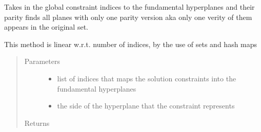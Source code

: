 \documentclass[letterpaper,10pt,english]{sphinxmanual}
\begin{document}
\begin{fulllineitems}
\label{\detokenize{ppopt.upop:ppopt.upop.upop_utils.get_outer_boundaries}}
\sphinxAtStartPar
Takes in the global constraint indices to the fundamental hyperplanes and their parity finds all planes with only one parity version aka only one verity of them appears in the original set.

\sphinxAtStartPar
This method is linear w.r.t. number of indices, by the use of sets and hash maps
\begin{quote}\begin{description}
\item[{Parameters}] \leavevmode\begin{itemize}
\item {} 
\sphinxAtStartPar
{} \textendash{} list of indices that maps the solution constraints into the fundamental hyperplanes

\item {} 
\sphinxAtStartPar
{} \textendash{} the side of the hyperplane that the constraint represents

\end{itemize}

\item[{Returns}] \leavevmode
\sphinxAtStartPar


\end{description}\end{quote}

\end{fulllineitems}

\end{document}

